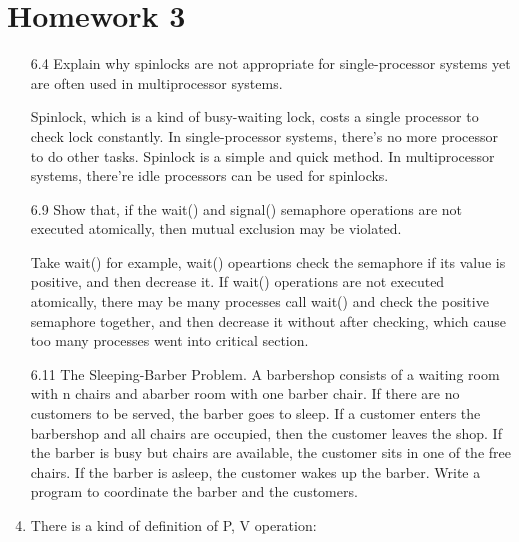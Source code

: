\chapter*{Homework 3}
\begin{enumerate}
    \item [6.4] Explain why spinlocks are not appropriate for single-processor systems yet are often used in multiprocessor systems.
    
    Spinlock, which is a kind of busy-waiting lock, costs a single processor to check lock constantly. In single-processor systems, there's no more processor to do other tasks. Spinlock is a simple and quick method. In multiprocessor systems, there're idle processors can be used for spinlocks.
    
    \item [6.9] Show that, if the wait() and signal() semaphore operations are not executed atomically, then mutual exclusion may be violated.
    
    Take wait() for example, wait() opeartions check the semaphore if its value is positive, and then decrease it. If wait() operations are not executed atomically, there may be many processes call wait() and check the positive semaphore together, and then decrease it without after checking, which cause too many processes went into critical section.
    
    \item [6.11] The Sleeping-Barber Problem. A barbershop consists of a waiting room with n chairs and abarber room with one barber chair. If there are no customers to be served, the barber goes to sleep. If a customer enters the barbershop and all chairs are occupied, then the customer leaves the shop. If the barber is busy but chairs are available, the customer sits in one of the free chairs. If the barber is asleep, the customer wakes up the barber. Write a program to coordinate the barber and the customers.
    
    
    
    \item There is a kind of definition of P, V operation:
    
    
    

\end{enumerate}
